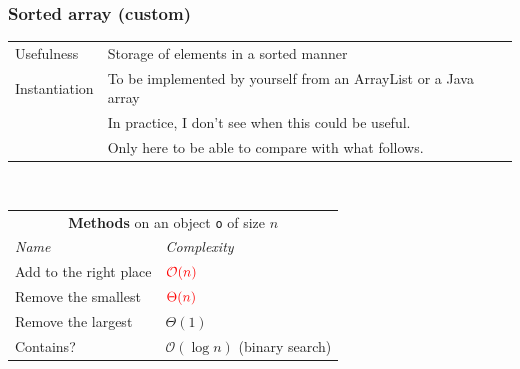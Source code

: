\documentclass[8pt,aspectratio=169]{beamer}
\begin{document}
\begin{frame}
\frametitle{Sorted array (custom)}
\centering
\begin{tabular}{ll}
	Usefulness & Storage of elements in a sorted manner\\
	Instantiation & To be implemented by yourself from an ArrayList or a Java array\\
	& \color{red} In practice, I don't see when this could be useful. \\
	& \color{red} Only here to be able to compare with what follows.
	
\end{tabular}\\
\vspace{0.5cm}
\centering
\begin{tabular}{ll}
	\multicolumn{2}{c}{\textbf{Methods} on an object \texttt{o} of size $n$} \\
	\textit{Name} & \textit{Complexity} \\
	Add to the right place & $\color{red}\mathcal{O}(n)$\\
	Remove the smallest & $\color{red}\Theta(n)$\\
	Remove the largest & $\Theta(1)$\\
	Contains? & $\mathcal{O}(\log n)$ (binary search)\\
\end{tabular}\\
\vspace{0.5cm}
\end{frame}
\end{document}
